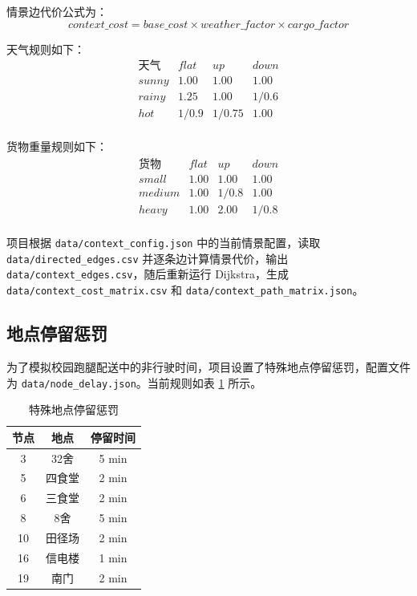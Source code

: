 \documentclass[12pt,a4paper,UTF8]{article}
\begin{document}
情景边代价公式为：
\[
    context\_cost = base\_cost \times weather\_factor \times cargo\_factor
\]

天气规则如下：
\[
\begin{array}{c|ccc}
\text{天气} & flat & up & down \\
\hline
sunny & 1.00 & 1.00 & 1.00 \\
rainy & 1.25 & 1.00 & 1/0.6 \\
hot & 1/0.9 & 1/0.75 & 1.00 \\
\end{array}
\]

货物重量规则如下：
\[
\begin{array}{c|ccc}
\text{货物} & flat & up & down \\
\hline
small & 1.00 & 1.00 & 1.00 \\
medium & 1.00 & 1/0.8 & 1.00 \\
heavy & 1.00 & 2.00 & 1/0.8 \\
\end{array}
\]

项目根据 \texttt{data/context\_config.json} 中的当前情景配置，读取 \texttt{data/directed\_edges.csv} 并逐条边计算情景代价，输出 \texttt{data/context\_edges.csv}，随后重新运行 Dijkstra，生成 \texttt{data/context\_cost\_matrix.csv} 和 \texttt{data/context\_path\_matrix.json}。

\subsection{地点停留惩罚}

为了模拟校园跑腿配送中的非行驶时间，项目设置了特殊地点停留惩罚，配置文件为 \texttt{data/node\_delay.json}。当前规则如表 \ref{tab:delay} 所示。

\begin{table}[H]
\centering
\caption{特殊地点停留惩罚}
\label{tab:delay}
\begin{tabular}{c|c|c}
\hline
节点 & 地点 & 停留时间 \\
\hline
3 & 32舍 & 5 min \\
5 & 四食堂 & 2 min \\
6 & 三食堂 & 2 min \\
8 & 8舍 & 5 min \\
10 & 田径场 & 2 min \\
16 & 信电楼 & 1 min \\
19 & 南门 & 2 min \\
\hline
\end{tabular}
\end{table}
\end{document}
